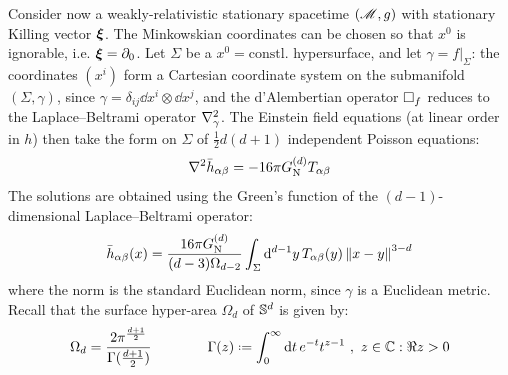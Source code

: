 Consider now a weakly-relativistic stationary spacetime $ (\mathscr{M} , g) $ with stationary Killing vector $ \boldsymbol{\xi} $. The Minkowskian coordinates can be chosen so that $ x^0 $ is ignorable, i.e. $ \boldsymbol{\xi} = \partial_0 $. Let $ \Sigma $ be a $ x^0 = \text{constl.} $ hypersurface, and let $ \gamma = f \vert_\Sigma $: the coordinates $ (x^i) $ form a Cartesian coordinate system on the submanifold $ (\Sigma , \gamma) $, since $ \gamma = \delta_{ij} \dd x^i \otimes \dd x^j $, and the d'Alembertian operator $ \Box_f $ reduces to the Laplace--Beltrami operator $ \nabla^2_\gamma $. The Einstein field equations (at linear order in $ h $) then take the form on $ \Sigma $ of $ \frac{1}{2} d (d+1) $ independent Poisson equations:
\begin{equation}
  \nabla^2 \bar{h}_{\alpha \beta} = - 16 \pi G_\text{N}^{(d)} T_{\alpha \beta}
\end{equation}
The solutions are obtained using the Green's function of the $ (d-1) $-dimensional Laplace--Beltrami operator:
\begin{equation}
  \bar{h}_{\alpha \beta}(x) = \frac{16 \pi G_\text{N}^{(d)}}{(d-3) \Omega_{d-2}} \int_\Sigma \mathrm{d}^{d-1} y \, T_{\alpha \beta}(y) \left\lVert x - y\right\rVert^{3-d}
\end{equation}
where the norm is the standard Euclidean norm, since $ \gamma $ is a Euclidean metric. Recall that the surface hyper-area $ \Omega_d $ of $ \mathbb{S}^{d} $ is given by:
\begin{equation}
  \Omega_d = \frac{2 \pi^{\frac{d+1}{2}}}{\Gamma(\frac{d+1}{2})}
  \qquad \qquad
  \Gamma(z) \defeq \int_0^{\infty} \dd t \, e^{-t} t^{z-1} \ , \ z \in \C : \Re z > 0
\end{equation}

